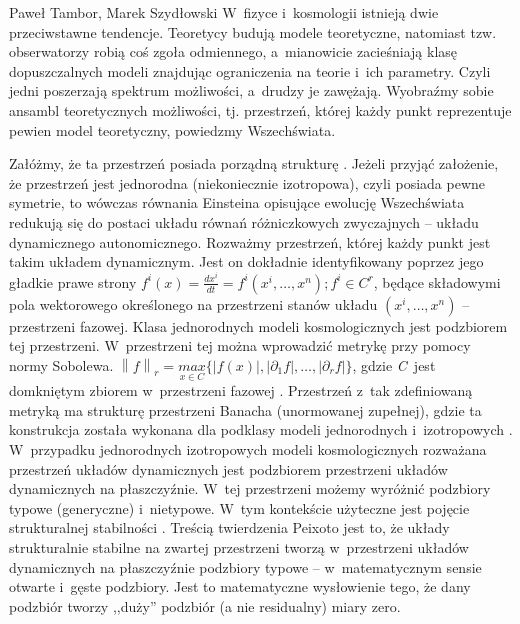 \begin{artplenv2auth}{Paweł Tambor, Marek Szydłowski}
W~fizyce i~kosmologii istnieją dwie przeciwstawne tendencje. Teoretycy budują modele teoretyczne, natomiast tzw. obserwatorzy robią coś zgoła odmiennego, a~mianowicie zacieśniają klasę dopuszczalnych modeli znajdując ograniczenia na teorie i~ich parametry. Czyli jedni poszerzają spektrum możliwości, a~drudzy je zawężają. Wyobraźmy sobie ansambl teoretycznych możliwości, tj. przestrzeń, której każdy punkt reprezentuje pewien model teoretyczny, powiedzmy Wszechświata.

Załóżmy, że ta przestrzeń posiada porządną strukturę
\parencite[][]{szydlowski_metoda_1982}. %
 Jeżeli przyjąć założenie, że przestrzeń jest jednorodna (niekoniecznie izotropowa), czyli posiada pewne symetrie, to wówczas równania Einsteina opisujące ewolucję Wszechświata redukują się do postaci układu równań różniczkowych zwyczajnych -- układu dynamicznego autonomicznego. Rozważmy przestrzeń, której każdy punkt jest takim układem dynamicznym. Jest on dokładnie identyfikowany poprzez jego gładkie prawe strony $f^i\left(x\right)=\frac{\mathit{dx}^i}{\mathit{dt}}=f^i\left(x^i,{\dots},x^n\right);f^i{\in}C^r$, będące składowymi pola wektorowego określonego na przestrzeni stanów układu $\left(x^i,{\dots},x^n\right)$ -- przestrzeni fazowej. Klasa jednorodnych modeli kosmologicznych jest podzbiorem tej przestrzeni. W~przestrzeni tej można wprowadzić metrykę przy pomocy normy Sobolewa. $\left\|f\right\|_r=\underset{x{\in}C}{\mathit{max}}\{\left|f\left(x\right)\right|,\left|{\partial}_1f\right|,{\dots},\left|{\partial}_rf\right|\}$, gdzie \textit{C}~jest domkniętym zbiorem w~przestrzeni fazowej 
\parencite[][]{perko_differential_1996}. %
 Przestrzeń z~tak zdefiniowaną metryką ma strukturę przestrzeni Banacha (unormowanej zupełnej), gdzie ta konstrukcja została wykonana dla podklasy modeli jednorodnych i~izotropowych 
\parencites[][]{szydlowski_towards_2007}[por.][]{szydlowski_cosmological_2007}. %
 W~przypadku jednorodnych izotropowych modeli kosmologicznych rozważana przestrzeń układów dynamicznych jest podzbiorem przestrzeni układów dynamicznych na płaszczyźnie. W~tej przestrzeni możemy wyróżnić podzbiory typowe (generyczne) i~nietypowe. W~tym kontekście użyteczne jest pojęcie strukturalnej stabilności 
\parencite[][]{tambor_czy_2017}. %
 Treścią twierdzenia Peixoto jest to, że układy strukturalnie stabilne na zwartej przestrzeni tworzą w~przestrzeni układów dynamicznych na płaszczyźnie podzbiory typowe -- w~matematycznym sensie otwarte i~gęste podzbiory. Jest to matematyczne wysłowienie tego, że dany podzbiór tworzy ,,duży'' podzbiór (a nie residualny) miary zero.
 

\end{artplenv2auth}
